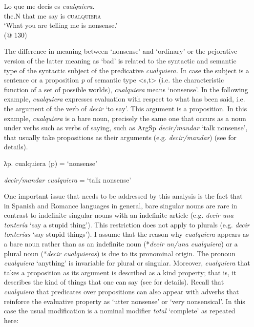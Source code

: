 \ea \label{ex:key:219}
    \gll Lo que me decís {es} \textit{cualquiera}.\\
    the.N that me say is \textsc{cualquiera}\\
    \glt ‘What you are telling me is nonsense.’\\
    (@ 130)
\z

The difference in meaning between ‘nonsense’ and ‘ordinary’ or the pejorative version of the latter meaning as ‘bad’ is related to the syntactic and semantic type of the syntactic subject of the predicative \textit{cualquiera.} In case the subject is a sentence or a proposition \textit{p} of semantic type <s,t> (i.e. the characteristic function of a set of possible worlds), \textit{cualquiera} means ‘nonsense’. In the following example, \textit{cualquiera} expresses evaluation with respect to what has been said, i.e. the argument of the verb of \textit{decir} ‘to say’. This argument is a proposition. In this example, \textit{cualquiera} is a bare noun, precisely the same one that occurs as a noun under verbs such as verbs of saying, such as ArgSp \textit{decir/mandar} ‘talk nonsense’, that usually take propositions as their arguments (e.g. \textit{decir/mandar}) (see  for details).

\ea \label{ex:key:220}
    λp. cualquiera (p) = ‘nonsense’

\textit{decir/mandar cualquiera} = ‘talk nonsense’
\z

One important issue that needs to be addressed by this analysis is the fact that in Spanish and Romance languages in general, bare singular nouns are rare in contrast to indefinite singular nouns with an indefinite article (e.g. \textit{decir una tontería} ‘say a stupid thing’). This restriction does not apply to plurals (e.g. \textit{decir tonterías} ‘say stupid things’). I assume that the reason why \textit{cualquiera} appears as a bare noun rather than as an indefinite noun (*\textit{decir un/una cualquiera}) or a plural noun (*\textit{decir cualquieras}) is due to its pronominal origin. The pronoun \textit{cualquiera} ‘anything’ is invariable for plural or singular. Moreover, \textit{cualquiera} that takes a proposition as its argument is described as a kind property; that is, it describes the kind of things that one can say (see  for details). Recall that \textit{cualquiera} that predicates over propositions can also appear with adverbs that reinforce the evaluative property as ‘utter nonsense’ or ‘very nonsensical’. In this case the usual modification is a nominal modifier \textit{total} ‘complete’ as repeated here:

